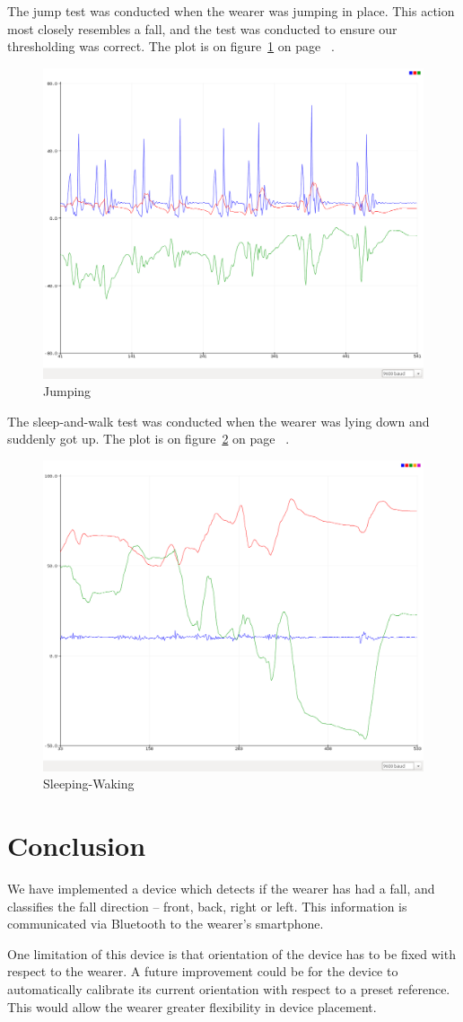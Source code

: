 \documentclass[11pt, a4paper]{article}
\begin{document}
\noindent The jump test was conducted when the wearer was jumping in place. This
action most closely resembles a fall, and the test was conducted to ensure our
thresholding was correct. The plot is on figure~\ref{fig:jumping} on page
~\pageref{fig:jumping}.
\begin{figure}
    \centering
    \includegraphics[width=0.75\linewidth]{jump.png}
    \caption{Jumping}
    \label{fig:jumping}
\end{figure}

\noindent The sleep-and-walk test was conducted when the wearer was lying down and suddenly
got up. The plot is on figure~\ref{fig:sleeping} on page ~\pageref{fig:sleeping}.
\begin{figure}
    \centering
    \includegraphics[width=0.75\linewidth]{sleep.png}
    \caption{Sleeping-Waking}
    \label{fig:sleeping}
\end{figure}

\section{Conclusion}
We have implemented a device which detects if the wearer has had a fall, and
classifies the fall direction -- front, back, right or left. This information
is communicated via Bluetooth to the wearer's smartphone.

One limitation of this device is that orientation of the device has to be
fixed with respect to the wearer.  A future improvement could be for the
device to automatically calibrate its current orientation with respect to a
preset reference. This would allow the wearer greater flexibility in device
placement.



\end{document}
